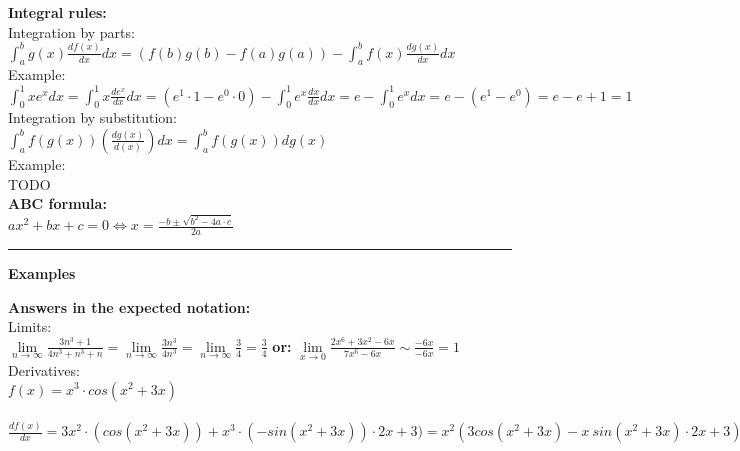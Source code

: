 \documentclass[12pt,a4paper]{report}
\begin{document}
	\textbf{Integral rules:}\\
	Integration by parts:\\
	$\int_{a}^{b} g(x) \frac{df(x)}{dx} dx = (f(b)g(b) - f(a)g(a)) - \int_{a}^{b} f(x) \frac{dg(x)}{dx}dx$\\
	Example:\\
	$\int_{0}^{1} xe^x dx = \int_{0}^{1} x \frac{d e^x}{dx} dx = (e^1 \cdot 1 - e^0 \cdot 0) - \int_{0}^{1} e^x \frac{dx}{dx}dx = e - \int_{0}^{1} e^x dx = e - (e^1 - e^0) = e - e+1 = 1$\\
	Integration by substitution:\\
	$\int_{a}^{b} f(g(x)) (\frac{dg(x)}{d(x)}) dx = \int_{a}^{b} f(g(x)) dg(x)$\\
	Example:\\
	TODO\\
	\textbf{ABC formula:}\\
	$ax^2 + bx + c = 0 \iff x = \frac{-b \pm \sqrt{b^2 - 4a \cdot c}}{2a}$\\
	
	\rule{17cm}{1pt}
	
	\begin{center}\textbf{Examples}\end{center}
	
	\textbf{Answers in the expected notation:}\\
	Limits:\\
	$\lim\limits_{n \to \infty} \frac{3n^3 + 1}{4n^3+n^3+n} = \lim\limits_{n \to \infty} \frac{3n^3}{4n^3} = \lim\limits_{n \to \infty} \frac{3}{4} = \frac{3}{4}$
	\textbf{or:} $\lim\limits_{x \to 0} \frac{2x^6 + 3x^2 - 6x}{7x^6 - 6x} \sim \frac{-6x}{-6x} = 1$\\
	
	Derivatives:\\
	$f(x) = x^3 \cdot cos (x^2 + 3x)$\\\
	$\frac{df(x)}{dx} = 3x^2 \cdot (cos(x^2 + 3x)) + x^3 \cdot (-sin (x^2 + 3x)) \cdot 2x+3) = x^2 (3 cos(x^2+3x) - x \ sin(x^2 + 3x) \cdot 2x + 3)$\\
	
\end{document}
